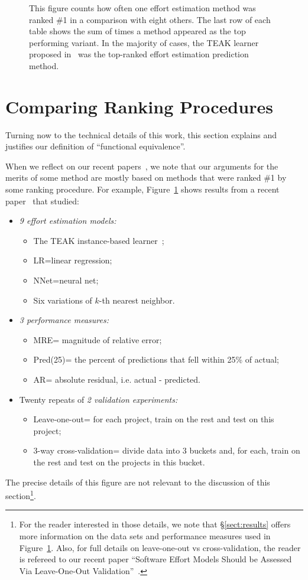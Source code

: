 \documentclass{sig-alternate}
\newcommand{\bi}{\begin{itemize}}
\newcommand{\ei}{\end{itemize}}
\newcommand{\tion}[1]{\S\ref{sect:#1}}
\newcommand{\fig}[1]{Figure~\ref{fig:#1}}
\begin{document}
\begin{figure}[!t]
\caption{
This figure counts how often one effort estimation method was ranked \#1 in a comparison
with eight others. 
The last row of each table shows the sum of times a method appeared as the top performing variant.
In the majority of cases, the TEAK learner proposed in~\cite{koc11b} was the top-ranked effort estimation prediction method.
}
\label{fig:loocv}
\end{figure}


\section{Comparing Ranking Procedures}
Turning now to the technical details
of this work,
this section explains and justifies our definition of ``functional
equivalence''.

When we reflect on our recent papers~\cite{koc11b,me11a}, we note that
our arguments for the merits of some
method are mostly based on methods that were  ranked \#1 by
some ranking procedure.  For example, \fig{loocv} shows 
results from a recent paper~\cite{koc11b} that studied:
\bi
\item {\em 9 effort estimation models:} 
\bi
\item
The TEAK instance-based learner~\cite{koc11b}; 
\item
LR=linear regression;  
\item
NNet=neural net;
\item Six
variations of  $k$-th nearest neighbor.
\ei
\item {\em 3 performance measures:} 
\bi
\item
MRE= magnitude of relative error; 
\item Pred(25)= the percent of predictions
that fell within 25\% of actual;
\item  AR= absolute residual, i.e. actual - predicted. 
\ei
\item Twenty repeats of {\em 2 validation experiments:}
\bi
\item
 Leave-one-out= for each project, train on the rest
and test on this project;
\item
 3-way cross-validation= divide data into 3 buckets and, for each, train on the rest
and test on the projects in this bucket.
\ei
\ei
The precise details of this figure are not relevant to the discussion of this section\footnote{
For the reader interested in those details, we note that \tion{results}
offers more information  on the data sets and performance measures used in \fig{loocv}.
Also, for full  details on leave-one-out vs cross-validation, the reader is refereed  to our recent paper
``Software Effort Models Should be Assessed Via 
         Leave-One-Out Validation''~\cite{koc13a}.}.
\end{document}
